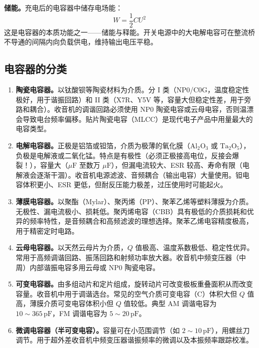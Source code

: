 \documentclass[12pt,UTF8]{ctexbook}
\begin{document}
\textbf{储能。}充电后的电容器中储存电场能：
\[
W = \frac{1}{2}CU^2
\]
这是电容器的本质功能之一——储能与释能。开关电源中的大电解电容可在整流桥不导通的间隔内向负载供电，维持输出电压平稳。

\subsection{电容器的分类}

\begin{enumerate}
\item \textbf{陶瓷电容器。}以钛酸钡等陶瓷材料为介质。分 I 类（NP0/C0G，温度稳定性极好，用于谐振回路）和 II 类（X7R、Y5V 等，容量大但稳定性差，用于旁路和耦合）。收音机的调谐回路必须使用 NP0 陶瓷电容或云母电容，否则温漂会导致电台频率偏移。贴片陶瓷电容（MLCC）是现代电子产品中用量最大的电容类型。

\item \textbf{电解电容器。}正极是铝箔或钽箔，介质为极薄的氧化膜（$\mathrm{Al_2O_3}$ 或 $\mathrm{Ta_2O_5}$），负极是电解液或二氧化锰。特点是有极性（必须正极接高电位，反接会爆裂！），容量大（$\mu\mathrm{F}$ 至数万 $\mu\mathrm{F}$），但漏电流较大、ESR 较高、寿命有限（电解液会逐渐干涸）。收音机电源滤波、音频耦合（输出电容）大量使用。钽电容体积更小、ESR 更低，但耐反压能力极差，过压使用时可能起火。

\item \textbf{薄膜电容器。}以聚酯（Mylar）、聚丙烯（PP）、聚苯乙烯等塑料薄膜为介质。无极性、漏电流极小、损耗低。聚丙烯电容（CBB）具有极低的介质损耗和优异的频率特性，是音频耦合和高频滤波的理想选择。聚苯乙烯电容精度极高，用于精密定时电路。

\item \textbf{云母电容器。}以天然云母片为介质，$Q$ 值极高、温度系数极低、稳定性优异。常用于高频调谐回路、振荡回路和射频功率放大器。收音机中频变压器（中周）内部谐振电容多用云母或 NP0 陶瓷电容。

\item \textbf{可变电容器。}由多组动片和定片组成，旋转动片可改变极板重叠面积从而改变容量。收音机中用于调谐选台。常见的空气介质可变电容（C）体积大但 $Q$ 值高，薄膜介质可变电容体积小但 $Q$ 值较低。典型 AM 调谐电容为 $10\sim365\,\mathrm{pF}$，FM 调谐电容为 $5\sim20\,\mathrm{pF}$。

\item \textbf{微调电容器（半可变电容）。}容量可在小范围调节（如 $2\sim10\,\mathrm{pF}$），用螺丝刀调节。用于超外差收音机中频变压器谐振频率的微调以及本振频率跟踪校准。
\end{enumerate}
\end{document}
